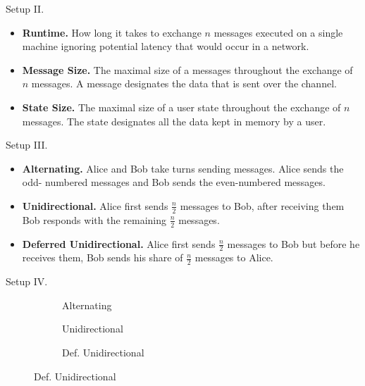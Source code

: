 \documentclass{beamer}
\begin{document}
\begin{frame}{Setup II.}
  \begin{itemize}
  \item \textbf{Runtime.} How long it takes to exchange $n$ messages
    executed on a single machine ignoring potential latency that would occur in a network.
  \item \textbf{Message Size.} The maximal size of a messages throughout the
    exchange of $n$ messages. A message designates the data that is sent over the channel.
  \item \textbf{State Size.} The maximal size of a user state throughout the
    exchange of $n$ messages. The state designates all the data kept in memory by a user.
  \end{itemize}
\end{frame}

\begin{frame}{Setup III.}
  \begin{itemize}
  \item \textbf{Alternating.} Alice and Bob take turns sending messages.
    Alice sends the odd- numbered messages and Bob sends the even-numbered messages.
  \item \textbf{Unidirectional.} Alice first sends $\frac{n}{2}$ messages to Bob,
    after receiving them Bob responds with the remaining $\frac{n}{2}$ messages.
  \item \textbf{Deferred Unidirectional.} Alice first sends $\frac{n}{2}$ messages
    to Bob but before he receives them, Bob sends his share of $\frac{n}{2}$ messages to Alice.
  \end{itemize}
\end{frame}

\begin{frame}{Setup IV.}
  \begin{figure}[H]
    \centering
    \noindent\begin{subfigure}[t]{0.32\linewidth}
      \centering
      
      \caption{Alternating}
    \end{subfigure}%
    \begin{subfigure}[t]{0.32\linewidth}
      \centering
      
      \caption{Unidirectional}
    \end{subfigure}%
    \begin{subfigure}[t]{0.32\linewidth}
      \centering
      
      \caption{Def. Unidirectional}
    \end{subfigure}
  \end{figure}
\end{frame}
\end{document}
